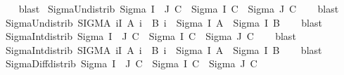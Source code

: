 \begin{isabellebody}
%
\isadelimproof
\ \ %
\endisadelimproof
%
\isatagproof
{}\isamarkupfalse%
\ blast%
\endisatagproof
{\isafoldproof}%
%
\isadelimproof
\isanewline
%
\endisadelimproof
\isanewline
{}\isamarkupfalse%
\ Sigma{\isacharunderscore}{\kern0pt}Un{\isacharunderscore}{\kern0pt}distrib{}{\isacharcolon}{\kern0pt}\ {\isachardoublequoteopen}Sigma\ {\isacharparenleft}{\kern0pt}I\ {\isasymunion}\ J{\isacharparenright}{\kern0pt}\ C\ {\isacharequal}{\kern0pt}\ Sigma\ I\ C\ {\isasymunion}\ Sigma\ J\ C{\isachardoublequoteclose}\isanewline
%
\isadelimproof
\ \ %
\endisadelimproof
%
\isatagproof
{}\isamarkupfalse%
\ blast%
\endisatagproof
{\isafoldproof}%
%
\isadelimproof
\isanewline
%
\endisadelimproof
\isanewline
{}\isamarkupfalse%
\ Sigma{\isacharunderscore}{\kern0pt}Un{\isacharunderscore}{\kern0pt}distrib{}{\isacharcolon}{\kern0pt}\ {\isachardoublequoteopen}{\isacharparenleft}{\kern0pt}SIGMA\ i{\isacharcolon}{\kern0pt}I{\isachardot}{\kern0pt}\ A\ i\ {\isasymunion}\ B\ i{\isacharparenright}{\kern0pt}\ {\isacharequal}{\kern0pt}\ Sigma\ I\ A\ {\isasymunion}\ Sigma\ I\ B{\isachardoublequoteclose}\isanewline
%
\isadelimproof
\ \ %
\endisadelimproof
%
\isatagproof
{}\isamarkupfalse%
\ blast%
\endisatagproof
{\isafoldproof}%
%
\isadelimproof
\isanewline
%
\endisadelimproof
\isanewline
{}\isamarkupfalse%
\ Sigma{\isacharunderscore}{\kern0pt}Int{\isacharunderscore}{\kern0pt}distrib{}{\isacharcolon}{\kern0pt}\ {\isachardoublequoteopen}Sigma\ {\isacharparenleft}{\kern0pt}I\ {\isasyminter}\ J{\isacharparenright}{\kern0pt}\ C\ {\isacharequal}{\kern0pt}\ Sigma\ I\ C\ {\isasyminter}\ Sigma\ J\ C{\isachardoublequoteclose}\isanewline
%
\isadelimproof
\ \ %
\endisadelimproof
%
\isatagproof
{}\isamarkupfalse%
\ blast%
\endisatagproof
{\isafoldproof}%
%
\isadelimproof
\isanewline
%
\endisadelimproof
\isanewline
{}\isamarkupfalse%
\ Sigma{\isacharunderscore}{\kern0pt}Int{\isacharunderscore}{\kern0pt}distrib{}{\isacharcolon}{\kern0pt}\ {\isachardoublequoteopen}{\isacharparenleft}{\kern0pt}SIGMA\ i{\isacharcolon}{\kern0pt}I{\isachardot}{\kern0pt}\ A\ i\ {\isasyminter}\ B\ i{\isacharparenright}{\kern0pt}\ {\isacharequal}{\kern0pt}\ Sigma\ I\ A\ {\isasyminter}\ Sigma\ I\ B{\isachardoublequoteclose}\isanewline
%
\isadelimproof
\ \ %
\endisadelimproof
%
\isatagproof
{}\isamarkupfalse%
\ blast%
\endisatagproof
{\isafoldproof}%
%
\isadelimproof
\isanewline
%
\endisadelimproof
\isanewline
{}\isamarkupfalse%
\ Sigma{\isacharunderscore}{\kern0pt}Diff{\isacharunderscore}{\kern0pt}distrib{}{\isacharcolon}{\kern0pt}\ {\isachardoublequoteopen}Sigma\ {\isacharparenleft}{\kern0pt}I\ {\isacharminus}{\kern0pt}\ J{\isacharparenright}{\kern0pt}\ C\ {\isacharequal}{\kern0pt}\ Sigma\ I\ C\ {\isacharminus}{\kern0pt}\ Sigma\ J\ C{\isachardoublequoteclose}\isanewline

\end{isabellebody}
